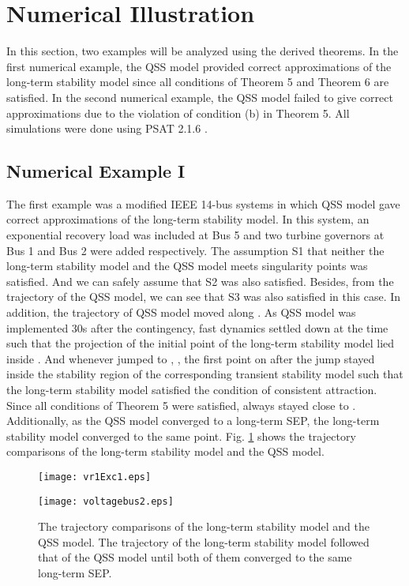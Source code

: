 \documentclass[journal]{IEEEtran}
\begin{document}
\section{Numerical Illustration} \label{numericalstudies}
In this section, two examples will be analyzed using the derived theorems. In the first numerical example, the QSS model provided correct approximations of the long-term stability model since all conditions of Theorem 5 and Theorem 6 are satisfied. In the second numerical example, the QSS model failed to give correct approximations due to the violation of condition (b) in Theorem 5. All simulations were done using PSAT 2.1.6 \cite{Milano:article}.
\subsection{Numerical Example I}
The first example was a modified IEEE 14-bus systems\cite{testcasearchive} in which QSS model gave correct approximations of the long-term stability model. In this system, an exponential recovery load was included at Bus 5 and two turbine governors at Bus 1 and Bus 2 were added respectively. The assumption S1 that neither the long-term stability model and the QSS model meets singularity points was satisfied. And we can safely assume that S2 was also satisfied. Besides, from the trajectory of the QSS model, we can see that S3 was also satisfied in this case. In addition, the trajectory  of QSS model moved along . As QSS model was implemented 30s after the contingency, fast dynamics settled down at the time such that the projection of the initial point  of the long-term stability model lied inside . And whenever  jumped to , , the first point  on   after the jump stayed inside the stability region of the corresponding transient stability model such that the long-term stability model satisfied the condition of consistent attraction. Since all conditions of Theorem 5 were satisfied,  always stayed close to . Additionally, as the QSS model converged to a long-term SEP, the long-term stability model converged to the same point. Fig. \ref{my14completeqss} shows the trajectory comparisons of the long-term stability model and the QSS model.
\begin{figure}[!ht]
\centering
\begin{minipage}[t]{0.5\linewidth}
\texttt{[image: vr1Exc1.eps]}
\end{minipage}\begin{minipage}[t]{0.5\linewidth}
\texttt{[image: voltagebus2.eps]}
\end{minipage}
\caption{The trajectory comparisons of the long-term stability model and the QSS model. The trajectory of the long-term stability model followed that of the QSS model until both of them converged to the same long-term SEP.}\label{my14completeqss}
\end{figure}
\end{document}
